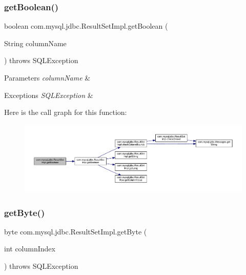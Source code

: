 \subsubsection{\texorpdfstring{get\+Boolean()}{getBoolean()}\hspace{0.1cm}{\footnotesize\ttfamily [2/2]}}
{\footnotesize\ttfamily boolean com.\+mysql.\+jdbc.\+Result\+Set\+Impl.\+get\+Boolean (\begin{DoxyParamCaption}\item[{String}]{column\+Name }\end{DoxyParamCaption}) throws S\+Q\+L\+Exception}


\begin{DoxyParams}{Parameters}
{\em column\+Name} & \\
\hline
\end{DoxyParams}

\begin{DoxyExceptions}{Exceptions}
{\em S\+Q\+L\+Exception} & \\
\hline
\end{DoxyExceptions}
Here is the call graph for this function\+:
\nopagebreak
\begin{figure}[H]
\begin{center}
\leavevmode
\includegraphics[width=350pt]{classcom_1_1mysql_1_1jdbc_1_1_result_set_impl_ac2abb257261b4664efc91722949ad378_cgraph}
\end{center}
\end{figure}
\mbox{\label{classcom_1_1mysql_1_1jdbc_1_1_result_set_impl_aa8f3b2bde47957027d8741c7ec1bd488}} 
\subsubsection{\texorpdfstring{get\+Byte()}{getByte()}\hspace{0.1cm}{\footnotesize\ttfamily [1/2]}}
{\footnotesize\ttfamily byte com.\+mysql.\+jdbc.\+Result\+Set\+Impl.\+get\+Byte (\begin{DoxyParamCaption}\item[{int}]{column\+Index }\end{DoxyParamCaption}) throws S\+Q\+L\+Exception}

